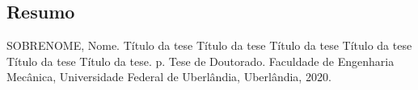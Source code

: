 \clearpage
\begin{center}
	\chapter*{Resumo}
\end{center}
\vspace{24pt}
\onehalfspacing
\noindent
SOBRENOME, Nome. Título da tese Título da tese Título da tese Título da tese Título da tese Título da tese. \pageref{LastPage}p. Tese de Doutorado. Faculdade de Engenharia Mecânica, Universidade Federal de Uberlândia, Uberlândia, 2020.\\

